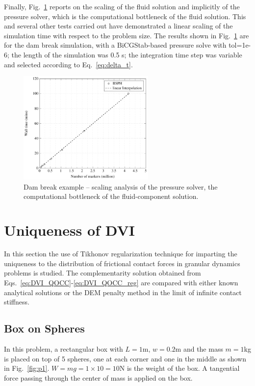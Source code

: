 Finally, Fig.~\ref{fig:scaling} reports on the scaling of the fluid solution and implicitly of the pressure solver, which is the computational bottleneck of the fluid solution. This and several other tests carried out have demonstrated a linear scaling of the simulation time with respect to the problem size. The results shown in Fig.~\ref{fig:scaling} are for the dam break simulation, with a BiCGStab-based pressure solve with tol=1e-6; the length of the simulation was 0.5 \si{s}; the integration time step was variable and selected according to Eq.~\ref{eq:delta_t}.


%
\begin{figure}[H]
	\begin{center}
		\includegraphics[width=0.6\textwidth]{images/IISPH/tikz/Scaling.png}
	\end{center}
	\caption{Dam break example -- scaling analysis of the pressure solver, the computational bottleneck of the fluid-component solution.}
	\label{fig:scaling}
\end{figure}




%
\section{Uniqueness of DVI}\label{sec:DVI_Uniq}
In this section the use of Tikhonov regularization technique for imparting the uniqueness to the distribution of frictional contact forces in granular dynamics problems is studied. The complementarity solution obtained from Eqs.~\ref{eq:DVI_QOCC}-\ref{eq:DVI_QOCC_reg} are compared with either known analytical solutions or the DEM penalty method in the limit of infinite contact stiffness. 

\subsection{Box on Spheres}\label{sec:boxSpheres}
In this problem, a rectangular box with $L=1$\si{m}, $w=0.2$\si{m} and the mass $m=1$\si{kg} is placed on top of 5 spheres, one at each corner and one in the middle as shown in Fig.~\ref{fig:p1}.  $W=mg=1\times10=10$\si{N} is the weight of the box. A tangential force passing through the center of mass is applied on the box.

